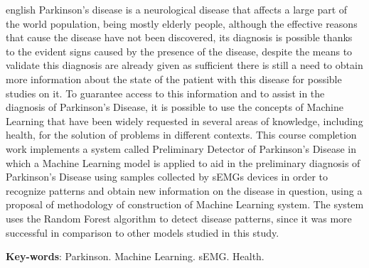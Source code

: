 \begin{resumo}[Abstract]

 \begin{otherlanguage*}{english}
  Parkinson's disease is a neurological disease that affects a large part of the world population, being mostly elderly people, although the effective reasons that cause the disease have not been discovered, its diagnosis is possible thanks to the evident signs caused by the presence of the disease, despite the means to validate this diagnosis are already given as sufficient there is still a need to obtain more information about the state of the patient with this disease for possible studies on it. To guarantee access to this information and to assist in the diagnosis of Parkinson's Disease, it is possible to use the concepts of Machine Learning that have been widely requested in several areas of knowledge, including health, for the solution of problems in different contexts. This course completion work implements a system called Preliminary Detector of Parkinson's Disease in which a Machine Learning model is applied to aid in the preliminary diagnosis of Parkinson's Disease using samples collected by sEMGs devices in order to recognize patterns and obtain new information on the disease in question, using a proposal of methodology of construction of Machine Learning system. The system uses the Random Forest algorithm to detect disease patterns, since it was more successful in comparison to other models studied in this study.

   \vspace{\onelineskip}
 
   \noindent 
   \textbf{Key-words}: Parkinson. Machine Learning. sEMG. Health.
 \end{otherlanguage*}
\end{resumo}
